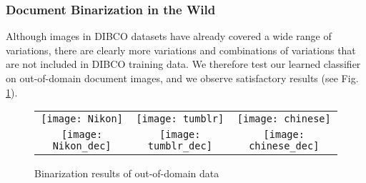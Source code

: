 \documentclass[onecolumn,11pt,draftcls,journal]{IEEEtran}
\def\fwV{.22}
\def\fhI{4.2cm}
\begin{document}
\subsubsection{Document Binarization in the Wild }
Although images in DIBCO datasets have already covered a wide range of variations, there are clearly more variations and combinations of variations that are not included in DIBCO training data. We therefore test our learned classifier on out-of-domain document images, and we observe satisfactory results (see Fig. \ref{fig.odd}).

\begin{figure}[!h]
\centering
\begin{tabular}{c@{}c@{}c@{}}
\texttt{[image: Nikon]}&\texttt{[image: tumblr]}&\texttt{[image: chinese]}\\
\texttt{[image: Nikon\_dec]}&\texttt{[image: tumblr\_dec]}&\texttt{[image: chinese\_dec]}\\
\end{tabular}
\caption{Binarization results of out-of-domain data}
\label{fig.odd}
\end{figure}
%
%
\end{document}
